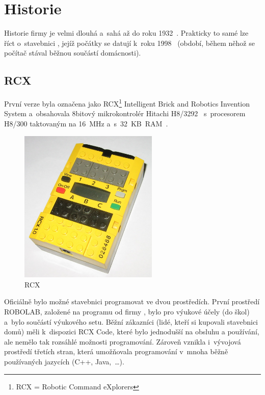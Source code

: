 \chapter{Historie \legoM}

Historie firmy \lego{ }je velmi dlouhá a~sahá až do roku 1932~\cite{lego_GroupHistory1930s}. 
Prakticky to samé lze říct o~stavebnici \legoM, jejíž počátky se datují k~roku 1998~\cite{lego_mindstormsHistory} (období, během něhož se počítač stával běžnou součástí domácnosti).


\section{\legoM{ }RCX}

První verze byla označena jako \legoM{ }RCX\footnote{RCX = Robotic Command eXplorers} Intelligent Brick and Robotics Invention System a~obsahovala 8bitový mikrokontrolér Hitachi H8/3292~\cite{hitachi_microcontrolerH8series} s~procesorem H8/300 taktovaným na 16~MHz a~s~32~KB~RAM~\cite{legoMindstormsRCX_Manual}.

\begin{figure}[h]
	\centering
	\includegraphics[width=250px]{images/lego-mindstorms-rcx_wikipedia.jpg}
	\caption[\legoM{ }RCX]{\legoM{ }RCX\protect\footnotemark}
	\label{fig:lego-mindstorms-rcx-wikipedia}
\end{figure}


Oficiálně bylo možné stavebnici programovat ve dvou prostředích. První prostředí ROBOLAB, založené na programu \labview{ }od firmy \NI, bylo pro výukové účely (do škol) a~bylo součástí výukového setu. 
Běžní zákazníci (lidé, kteří si kupovali stavebnici domů) měli k~dispozici RCX Code, které bylo jednodušší na obsluhu a používání, ale nemělo tak rozsáhlé možnosti programování. 
Zároveň vznikla i~vývojová prostředí třetích stran, která umožňovala programování v~mnoha běžně používaných jazycích (C++, Java,~\dots).

